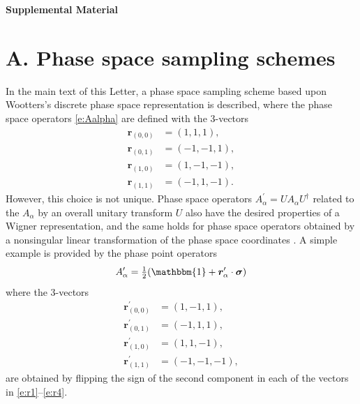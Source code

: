 \documentclass[aps,prl,showpacs,amsmath,amssymb,superscriptaddress,reprint,10pt]{revtex4-1}
\newcommand\id{{\mathbbm{1}}}
\newcommand{\mvec}[1]{\boldsymbol #1}
\begin{document}
\newpage

\begin{center}
{\bf Supplemental Material}  
\end{center}
\vspace{-3mm}
\appendix
{}


\section{A. Phase space sampling schemes}
\setcounter{section}{1}
\setcounter{equation}{0}
\setcounter{figure}{0}

In the main text of this Letter, a phase space sampling scheme based upon Wootters's discrete phase space representation is described, where the phase space operators \eqref{e:Aalpha} are defined with the 3-vectors
\begin{subequations}
\begin{align}
\mvec{r}_{(0,0)}&=(1,1,1),\label{e:r1}\\
\mvec{r}_{(0,1)}&=(-1,-1,1),\\
\mvec{r}_{(1,0)}&=(1,-1,-1),\\
\mvec{r}_{(1,1)}&=(-1,1,-1).\label{e:r4}
\end{align}
\end{subequations}
However, this choice is not unique. Phase space operators $A_\alpha^\prime=UA_\alpha U^\dagger$ related to the $A_\alpha$ by an overall unitary transform $U$ also have the desired properties of a Wigner representation, and the same holds for phase space operators obtained by a nonsingular linear transformation of the phase space coordinates \cite{Wootters87}. A simple example is provided by the phase point operators
\begin{equation}
A_\alpha^\prime = \tfrac{1}{2}(\id+\mvec{r}_\alpha^\prime\cdot\mvec{\sigma})
\end{equation}
where the 3-vectors
\begin{subequations}
\begin{align}
\mvec{r}_{(0,0)}^\prime&=(1,-1,1),\\
\mvec{r}_{(0,1)}^\prime&=(-1,1,1),\\
\mvec{r}_{(1,0)}^\prime&=(1,1,-1),\\
\mvec{r}_{(1,1)}^\prime&=(-1,-1,-1),
\end{align}
\end{subequations}
are obtained by flipping the sign of the second component in each of the vectors in \eqref{e:r1}--\eqref{e:r4}.
\end{document}
